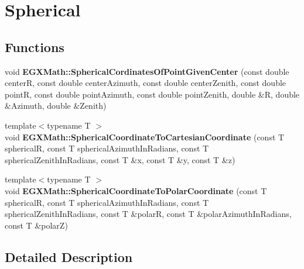 \hypertarget{group___e_g_x_math-_conversions-_coordinate_conversions-_spherical}{}\section{Spherical}
\label{group___e_g_x_math-_conversions-_coordinate_conversions-_spherical}
\subsection*{Functions}
\begin{DoxyCompactItemize}
\item 
\mbox{\label{group___e_g_x_math-_conversions-_coordinate_conversions-_spherical_ga5e0fc2c7d32d36516e84dcfc451da856}} 
void {\bfseries E\+G\+X\+Math\+::\+Spherical\+Cordinates\+Of\+Point\+Given\+Center} (const double centerR, const double center\+Azimuth, const double center\+Zenith, const double pointR, const double point\+Azimuth, const double point\+Zenith, double \&R, double \&Azimuth, double \&Zenith)
\item 
\mbox{\label{group___e_g_x_math-_conversions-_coordinate_conversions-_spherical_ga6a11867b77c662565471eabac9b4d114}} 
{\footnotesize template$<$typename T $>$ }\\void {\bfseries E\+G\+X\+Math\+::\+Spherical\+Coordinate\+To\+Cartesian\+Coordinate} (const T sphericalR, const T spherical\+Azimuth\+In\+Radians, const T spherical\+Zenith\+In\+Radians, const T \&x, const T \&y, const T \&z)
\item 
\mbox{\label{group___e_g_x_math-_conversions-_coordinate_conversions-_spherical_ga89dff5914186983d788e5b320c9ca3c1}} 
{\footnotesize template$<$typename T $>$ }\\void {\bfseries E\+G\+X\+Math\+::\+Spherical\+Coordinate\+To\+Polar\+Coordinate} (const T sphericalR, const T spherical\+Azimuth\+In\+Radians, const T spherical\+Zenith\+In\+Radians, const T \&polarR, const T \&polar\+Azimuth\+In\+Radians, const T \&polarZ)
\end{DoxyCompactItemize}


\subsection{Detailed Description}

